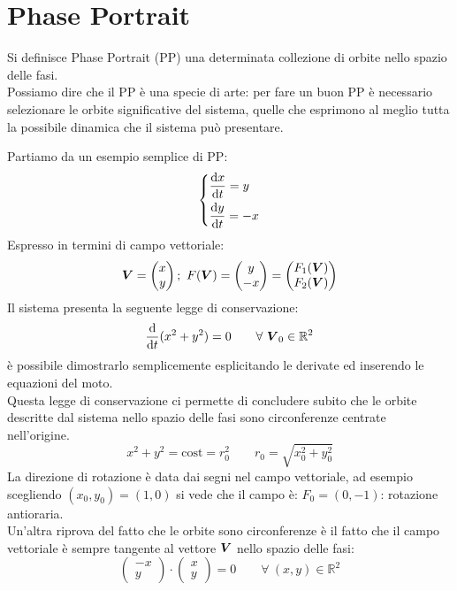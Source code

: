\section{Phase Portrait}%
\label{sub:Phase Portrait}
Si definisce Phase Portrait (PP) una determinata collezione di orbite nello spazio delle fasi. \\
Possiamo dire che il PP è una specie di arte: per fare un buon PP è necessario selezionare le orbite significative del sistema, quelle che esprimono al meglio tutta la possibile dinamica che il sistema può presentare.
\begin{exmp}
    Partiamo da un esempio semplice di PP:
    \[\begin{dcases}
        \frac{\text{d} x}{\text{d} t} = y \\
	\frac{\text{d} y}{\text{d} t} = -x
    \end{dcases}\] 
    Espresso in termini di campo vettoriale:
    \[
     \boldsymbol{V}=\begin{pmatrix} x \\ y \end{pmatrix};
    \ F(\boldsymbol{V})=\begin{pmatrix} y \\ -x \end{pmatrix}  = \begin{pmatrix} F_1(\boldsymbol{V}) \\  F_2(\boldsymbol{V}) \end{pmatrix} 
    \] 
    Il sistema presenta la seguente legge di conservazione:
    \[
	\frac{\text{d} }{\text{d} t} (x^2 + y^2) = 0 \qquad \forall \ \boldsymbol{V}_0 \in \mathbb{R}^2
    \] 
    è possibile dimostrarlo semplicemente esplicitando le derivate ed inserendo le equazioni del moto.\\
    Questa legge di conservazione ci permette di concludere subito che le orbite descritte dal sistema nello spazio delle fasi sono circonferenze centrate nell'origine.
    \[
        x^2+y^2=\text{cost} = r_0^2 \qquad r_0 = \sqrt{x_0^2+y_0^2} 
    \] 
    La direzione di rotazione è data dai segni nel campo vettoriale, ad esempio scegliendo $(x_0, y_0) = (1, 0)$ si vede che il campo è: $F_0 = (0, -1)$: rotazione antioraria.\\
    Un'altra riprova del fatto che le orbite sono circonferenze è il fatto che il campo vettoriale è sempre tangente al vettore $\boldsymbol{V}$ nello spazio delle fasi:
    \[
	\begin{pmatrix} -x \\ y \end{pmatrix} \cdot \begin{pmatrix} x \\ y \end{pmatrix} = 0 \qquad \forall \ (x, y) \in \mathbb{R}^2
    \] 
\end{exmp}
